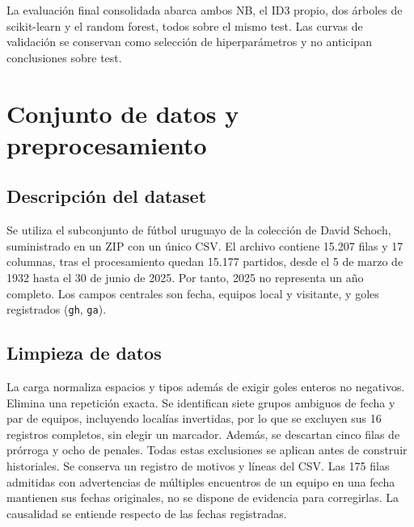 \documentclass[conference]{IEEEtran}
\begin{document}
La evaluación final consolidada abarca ambos NB, el ID3 propio, dos árboles de scikit-learn y el random forest, todos sobre el mismo test. Las curvas de validación se conservan como selección de hiperparámetros y no anticipan conclusiones sobre test.

\section{Conjunto de datos y preprocesamiento}
\label{sec:preprocesamiento}

\subsection{Descripción del dataset}
Se utiliza el subconjunto de fútbol uruguayo de la colección de David Schoch\cite{b1}, suministrado en un ZIP con un único CSV. El archivo contiene 15.207 filas y 17 columnas, tras el procesamiento quedan 15.177 partidos, desde el 5 de marzo de 1932 hasta el 30 de junio de 2025. Por tanto, 2025 no representa un año completo. Los campos centrales son fecha, equipos local y visitante, y goles registrados (\texttt{gh}, \texttt{ga}).

\subsection{Limpieza de datos}
La carga normaliza espacios y tipos además de exigir goles enteros no negativos. Elimina una repetición exacta. Se identifican siete grupos ambiguos de fecha y par de equipos, incluyendo localías invertidas, por lo que se excluyen sus 16 registros completos, sin elegir un marcador. Además, se descartan cinco filas de prórroga y ocho de penales. Todas estas exclusiones se aplican antes de construir historiales. Se conserva un registro de motivos y líneas del CSV. Las 175 filas admitidas con advertencias de múltiples encuentros de un equipo en una fecha mantienen sus fechas originales, no se dispone de evidencia para corregirlas. La causalidad se entiende respecto de las fechas registradas.
\end{document}
